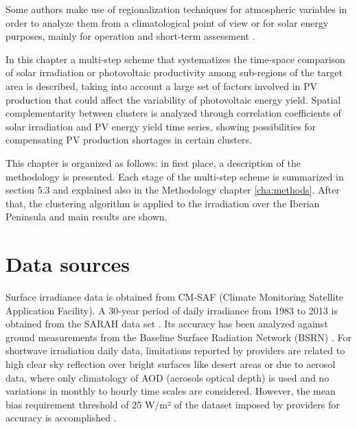 Some authors make use of regionalization techniques for atmospheric variables in order to analyze them from a climatological point of view \cite*{Argueso2011} or for solar energy purposes, mainly for operation and short-term assessment \cite*{Zagouras2013, Zagouras2014, Zagouras2014b}.

In this chapter a multi-step scheme that systematizes the time-space comparison of solar irradiation or photovoltaic productivity among sub-regions of the target area is described, taking into account a large set of factors involved in PV production that could affect the variability of photovoltaic energy yield. Spatial complementarity between clusters is analyzed through correlation coefficients of solar irradiation and PV energy yield time series, showing possibilities for compensating PV production shortages in certain clusters.


This chapter is organized as follows: in first place, a description of the methodology is presented. Each stage of the multi-step scheme is summarized in section 5.3 and explained also in the Methodology chapter \ref{cha:methods}. After that, the clustering algorithm is applied to the irradiation over the Iberian Peninsula and main results are shown.

\section{Data sources}

Surface irradiance data is obtained from CM-SAF (Climate Monitoring Satellite Application Facility). A 30-year period of daily irradiance from 1983 to 2013 is obtained from the SARAH data set \cite*{Muller2015}. Its accuracy has been analyzed \cite*{Posselt2012, Muller2015} against ground measurements from the Baseline Surface Radiation Network (BSRN) \cite*{Ohmura}. For shortwave irradiation daily data, limitations reported by providers are related to high clear sky reflection over bright surfaces like desert areas or due to aerosol data, where only climatology of AOD (aerosols optical depth) is used and no variations in monthly to hourly time scales are considered. However, the mean bias requirement threshold of 25 W/m² of the dataset imposed by providers for accuracy is accomplished \cite*{Posselt2012, Muller2015}. 

